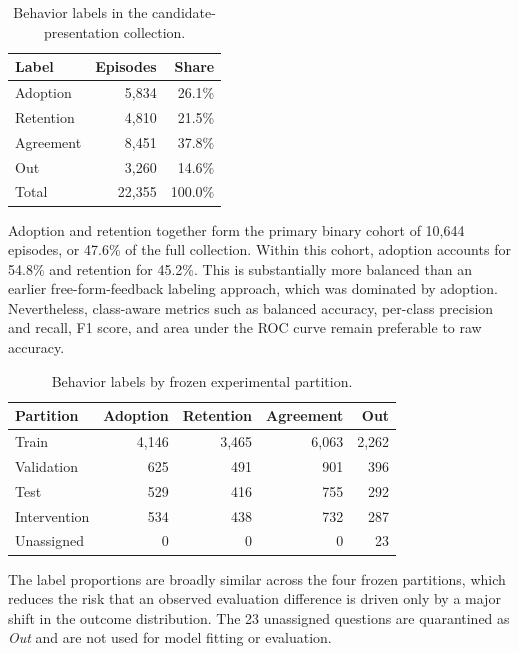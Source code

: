 \begin{table}[htbp]
    \centering
    \caption{Behavior labels in the candidate-presentation collection.}
    \label{tab:eda-label-counts}
    \begin{tabular}{lrr}
        \toprule
        Label & Episodes & Share \\
        \midrule
        Adoption  & 5,834 & 26.1\% \\
        Retention & 4,810 & 21.5\% \\
        Agreement & 8,451 & 37.8\% \\
        Out       & 3,260 & 14.6\% \\
        \midrule
        Total     & 22,355 & 100.0\% \\
        \bottomrule
    \end{tabular}
\end{table}

Adoption and retention together form the primary binary cohort of 10,644
episodes, or 47.6\% of the full collection. Within this cohort, adoption
accounts for 54.8\% and retention for 45.2\%. This is substantially more
balanced than an earlier free-form-feedback labeling approach, which was
dominated by adoption. Nevertheless, class-aware metrics such as balanced
accuracy, per-class precision and recall, F1 score, and area under the ROC
curve remain preferable to raw accuracy.

\begin{table}[htbp]
    \centering
    \caption{Behavior labels by frozen experimental partition.}
    \label{tab:eda-partitions}
    \begin{tabular}{lrrrr}
        \toprule
        Partition & Adoption & Retention & Agreement & Out \\
        \midrule
        Train        & 4,146 & 3,465 & 6,063 & 2,262 \\
        Validation   &   625 &   491 &   901 &   396 \\
        Test         &   529 &   416 &   755 &   292 \\
        Intervention &   534 &   438 &   732 &   287 \\
        Unassigned   &     0 &     0 &     0 &    23 \\
        \bottomrule
    \end{tabular}
\end{table}

The label proportions are broadly similar across the four frozen partitions,
which reduces the risk that an observed evaluation difference is driven only
by a major shift in the outcome distribution. The 23 unassigned questions are
quarantined as \emph{Out} and are not used for model fitting or evaluation.

